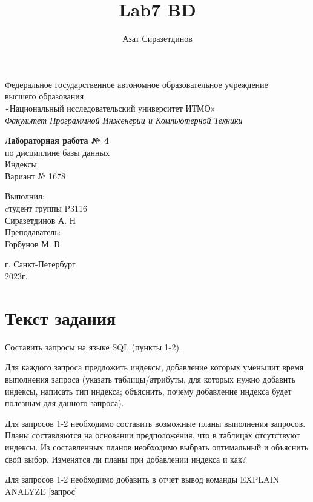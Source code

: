 \documentclass[12pt]{article}
\title{Lab7 BD}
\author{Азат Сиразетдинов}
\begin{document}
	{\thispagestyle{empty}
	\begin{center}
		Федеральное государственное автономное образовательное учреждение\\ 
		высшего образования\\
		«Национальный исследовательский университет ИТМО»\\
		\textit{Факультет Программной Инженерии и Компьютерной Техники}\\
	\end{center}
	\vspace{2cm}
	\begin{center}
		\large
		\textbf{Лабораторная работа № 4}\\
		по дисциплине базы данных\\
		Индексы\\
		Вариант № 1678
	\end{center}
	\vspace{7cm}
	\begin{flushright}
		Выполнил:\\
		cтудент  группы P3116\\
		Сиразетдинов А. Н\\
		Преподаватель: \\
		Горбунов М. В.\\
	\end{flushright}
	\vspace{6cm}
	\begin{center}
		г. Санкт-Петербург\\
		2023г.
	\end{center}
	\newpage
	}
	\tableofcontents
	\newpage
	
	\section{Текст задания}
	Составить запросы на языке SQL (пункты 1-2).
	
	Для каждого запроса предложить индексы, добавление которых уменьшит время выполнения запроса (указать таблицы/атрибуты, для которых нужно добавить индексы, написать тип индекса; объяснить, почему добавление индекса будет полезным для данного запроса).
	
	Для запросов 1-2 необходимо составить возможные планы выполнения запросов. Планы составляются на основании предположения, что в таблицах отсутствуют индексы. Из составленных планов необходимо выбрать оптимальный и объяснить свой выбор.
	Изменятся ли планы при добавлении индекса и как?
	
	Для запросов 1-2 необходимо добавить в отчет вывод команды EXPLAIN ANALYZE [запрос]
	
\end{document}

